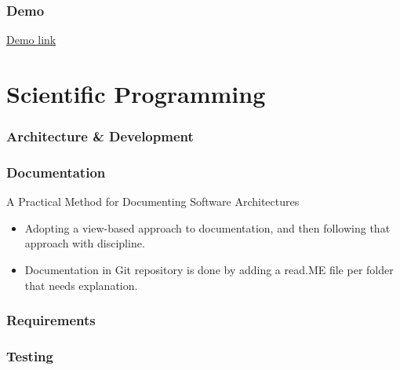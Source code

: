 \documentclass[12pt]{beamer}
\begin{document}
    \begin{frame}
        \frametitle{Demo}
        \href{http://dev-jiskefet.westeurope.cloudapp.azure.com/}{Demo link}
    \end{frame}

    \section{Scientific Programming}
    \begin{frame}
        \frametitle{Architecture \& Development}
    \end{frame}

    \begin{frame}
        \frametitle{Documentation}
        A Practical Method for Documenting Software Architectures
    \begin{itemize}
        \item Adopting a view-based approach to documentation,
        and then following that approach with discipline.
        \item Documentation in Git repository is done by adding a read.ME file
        per folder that needs explanation.
    \end{itemize}
    \end{frame}

    \begin{frame}
        \frametitle{Requirements}
    \end{frame}

    \begin{frame}
        \frametitle{Testing}
    \end{frame}
\end{document}
